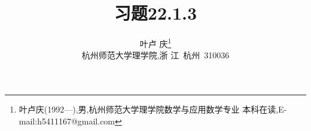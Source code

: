 \documentclass[twoside,11pt]{article}
\begin{document}
\title{\huge{\bf{习题22.1.3}}} \author{\small{叶卢
    庆\footnote{叶卢庆(1992---),男,杭州师范大学理学院数学与应用数学专业
      本科在读,E-mail:h5411167@gmail.com}}\\{\small{杭州师范大学理学院,浙
      江~杭州~310036}}} \date{}
\maketitle




\vspace{30pt} %
\end{document}
